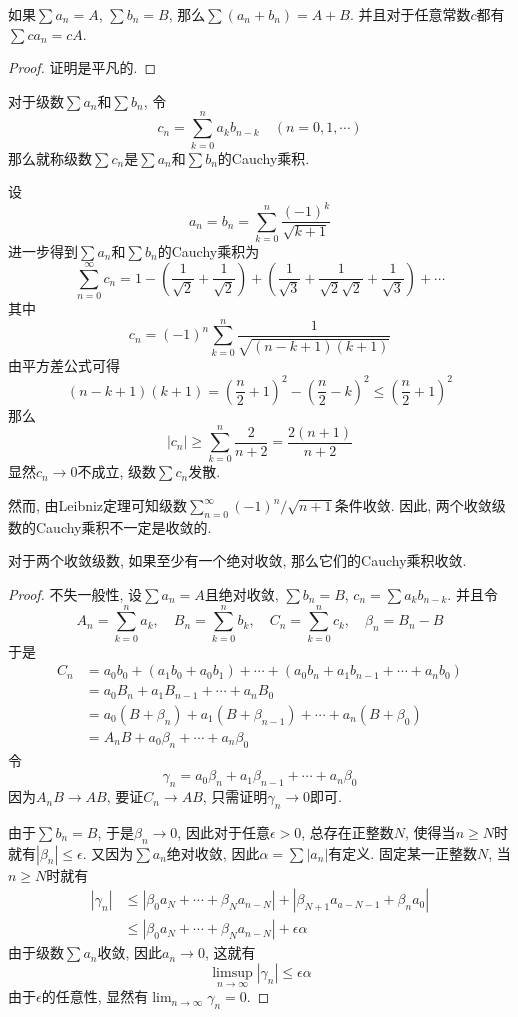 \documentclass[cn,12pt,math=mtpro2,citestyle=gb7714-2015,bibstyle=gb7714-2015,twocol]{elegantbook}
\newcommand{\limn }{\lim_{n\to\infty}}
\begin{document}
\begin{theorem}
  如果$\sum a_n=A$, $\sum b_n=B$, 那么$\sum(a_n+b_n)=A+B$. 并且对于任意常数$c$都有$\sum ca_n=cA$.
\end{theorem}
\begin{proof}
  证明是平凡的.
\end{proof}
\begin{definition}
对于级数$\sum a_n$和$\sum b_n$, 令
$$c_n=\sum_{k=0}^{n}a_kb_{n-k}\quad (n=0,1,\cdots)$$
那么就称级数$\sum c_n$是$\sum a_n$和$\sum b_n$的Cauchy乘积.
\end{definition}
\begin{example}
设
$$a_n=b_n=\sum_{k=0}^{n}\frac{(-1)^k}{\sqrt{k+1}}$$
进一步得到$\sum a_n$和$\sum b_n$的Cauchy乘积为
$$\sum_{n=0}^{\infty}c_n=1-\left(\frac{1}{\sqrt{2}}+\frac{1}{\sqrt{2}}\right)+\left(\frac{1}{\sqrt{3}}+\frac{1}{\sqrt{2}\sqrt{2}}+\frac{1}{\sqrt{3}}\right)+\cdots$$
其中
$$c_n=(-1)^n\sum_{k=0}^{n}\frac{1}{\sqrt{(n-k+1)(k+1)}}$$
由平方差公式可得
$$(n-k+1)(k+1)=\left(\frac{n}{2}+1\right)^2-\left(\frac{n}{2}-k\right)^2\leq\left(\frac{n}{2}+1\right)^2$$
那么
$$|c_n|\geq \sum_{k=0}^{n}\frac{2}{n+2}=\frac{2(n+1)}{n+2}$$
显然$c_n\rightarrow 0$不成立, 级数$\sum c_n$发散.

然而, 由Leibniz定理可知级数$\sum_{n=0}^{\infty}(-1)^n/\sqrt{n+1}$条件收敛. 因此, 两个收敛级数的Cauchy乘积不一定是收敛的.
\end{example}
\begin{theorem}[Mertens定理]
  对于两个收敛级数, 如果至少有一个绝对收敛, 那么它们的Cauchy乘积收敛.
\end{theorem}
\begin{proof}
  不失一般性, 设$\sum a_n=A$且绝对收敛, $\sum b_n=B$, $c_n=\sum a_kb_{n-k}$. 并且令
  $$A_n=\sum_{k=0}^{n}a_k,\quad B_n=\sum_{k=0}^{n}b_k,\quad C_n=\sum_{k=0}^{n}c_k, \quad \beta_n=B_n-B$$
  于是
  \begin{align*}
  C_n&=a_0b_0+(a_1b_0+a_0b_1)+\cdots+(a_0b_n+a_1b_{n-1}+\cdots+a_nb_0) \\
  &=a_0B_n+a_1B_{n-1}+\cdots+a_nB_0 \\
  &=a_0(B+\beta_n)+a_1(B+\beta_{n-1})+\cdots+a_n(B+\beta_0) \\
  &=A_nB+a_0\beta_n+\cdots+a_n\beta_0
  \end{align*}
  令
  $$\gamma_n=a_0\beta_n+a_1\beta_{n-1}+\cdots+a_n\beta_0$$
  因为$A_nB\rightarrow AB$, 要证$C_n\rightarrow AB$, 只需证明$\gamma_n\rightarrow 0$即可.

  由于$\sum b_n=B$, 于是$\beta_n\rightarrow0$, 因此对于任意$\epsilon>0$, 总存在正整数$N$, 使得当$n\geq N$时就有$|\beta_n|\leq\epsilon$. 又因为$\sum a_n$绝对收敛, 因此$\alpha=\sum |a_n|$有定义. 固定某一正整数$N$, 当$n\geq N$时就有
  \begin{align*}
  |\gamma_n|&\leq |\beta_0a_N+\cdots+\beta_Na_{n-N}|+|\beta_{N+1}a_{a-N-1}+\beta_na_0| \\
  &\leq |\beta_0a_N+\cdots+\beta_Na_{n-N}|+\epsilon\alpha
  \end{align*}
  由于级数$\sum a_n$收敛, 因此$a_n\rightarrow 0$, 这就有
  $$\limsup_{n\to\infty} |\gamma_n|\leq \epsilon\alpha$$
  由于$\epsilon$的任意性, 显然有$\displaystyle \limn \gamma_n=0$.

\end{proof}
\end{document}
